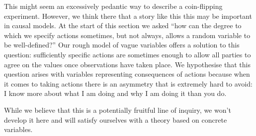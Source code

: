 This might seem an excessively pedantic way to describe a coin-flipping experiment. However, we think there that a story like this this may be important in causal models. At the start of this section we asked ``how can the degree to which we specify actions sometimes, but not always, allows a random variable to be well-defined?'' Our rough model of vague variables offers a solution to this question: sufficiently specific actions are sometimes enough to allow all parties to agree on the values once observations have taken place. We hypothesise that this question arises with variables representing consequences of actions because when it comes to taking actions there is an asymmetry that is extremely hard to avoid: I know more about what I am doing and why I am doing it than you do.

While we believe that this is a potentially fruitful line of inquiry, we won't develop it here and will satisfy ourselves with a theory based on concrete variables.